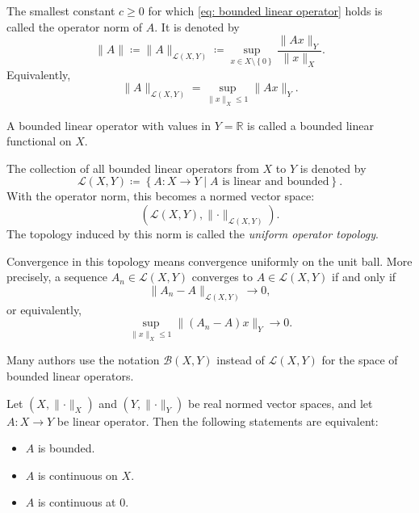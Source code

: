 \begin{remark}
    The smallest constant \(c \ge 0\) for which \autoref{eq: bounded linear operator} holds is called the operator norm of \(A\). It is denoted by 
    \[
        \lVert A \rVert \coloneqq \lVert A \rVert_{\mathcal{L} (X, Y)} \coloneqq \sup _{x \in X \setminus \left\{ 0 \right\} } \frac{\lVert Ax \rVert_Y }{\lVert x \rVert_X }.  
    \]
    Equivalently, 
    \[
        \lVert A \rVert_{\mathcal{L} (X, Y)} = \sup _{\lVert x \rVert_X \le 1} \lVert A x \rVert_Y.  
    \]
\end{remark}   

\begin{remark}
    A bounded linear operator with values in \(Y = \mathbb{R}\) is called a bounded linear functional on \(X\).  
\end{remark}

The collection of all bounded linear operators from \(X\) to \(Y\) is denoted by 
\[
    \mathcal{L} (X, Y) \coloneqq \left\{ A: X \to Y \mid A \text{ is linear and bounded}  \right\}. 
\]  
With the operator norm, this becomes a normed vector space:
\[
    \left( \mathcal{L} (X, Y), \lVert \cdot \rVert_{\mathcal{L} (X, Y)}  \right). 
\]
The topology induced by this norm is called the \emph{uniform operator topology}.

Convergence in this topology means convergence uniformly on the unit ball. More precisely, a sequence \(A_n \in \mathcal{L} (X, Y)\) converges to \(A \in \mathcal{L} (X, Y)\) if and only if 
\[
    \lVert A_n - A \rVert_{\mathcal{L} (X, Y)} \to 0, 
\]  
or equivalently,
\[
    \sup _{\lVert x \rVert_X \le 1} \lVert (A_n - A) x \rVert_Y \to 0.
\]

\begin{remark}
    Many authors use the notation \(\mathcal{B} (X, Y)\) instead of \(\mathcal{L} (X, Y)\) for the space of bounded linear operators. 
\end{remark}

\begin{theorem} \label{thm: bounded linear operator TFAE}
    Let \((X, \lVert \cdot \rVert_X )\) and \((Y, \lVert \cdot \rVert_Y )\) be real normed vector spaces, and let \(A: X \to Y\) be linear operator. Then the following statements are equivalent:
    \begin{itemize}
        \item [(i)] \(A\) is bounded. 
        \item [(ii)] \(A\) is continuous on \(X\). 
        \item [(iii)] \(A\) is continuous at \(0\).     
    \end{itemize}   
\end{theorem}

